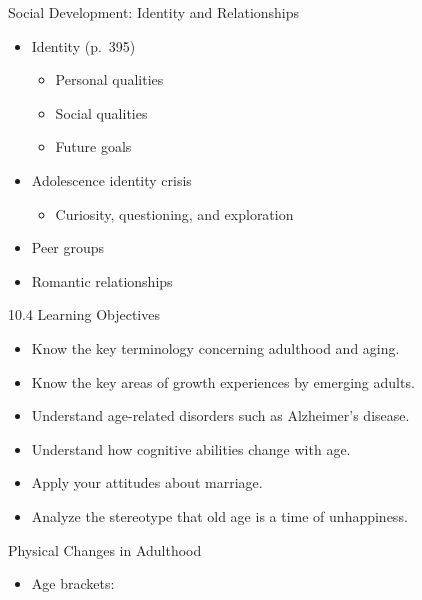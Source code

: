 \documentclass[
]{book}
\providecommand{\tightlist}{%
  \setlength{\itemsep}{0pt}\setlength{\parskip}{0pt}}
\begin{document}
\begin{reflect}
Social Development: Identity and Relationships

\begin{itemize}
\tightlist
\item
  Identity (p.~395)

  \begin{itemize}
  \tightlist
  \item
    Personal qualities\\
  \item
    Social qualities\\
  \item
    Future goals\\
  \end{itemize}
\item
  Adolescence identity crisis

  \begin{itemize}
  \tightlist
  \item
    Curiosity, questioning, and exploration\\
  \end{itemize}
\item
  Peer groups\\
\item
  Romantic relationships
\end{itemize}

10.4 Learning Objectives

\begin{itemize}
\tightlist
\item
  Know the key terminology concerning adulthood and aging.\\
\item
  Know the key areas of growth experiences by emerging adults.\\
\item
  Understand age-related disorders such as Alzheimer's disease.\\
\item
  Understand how cognitive abilities change with age.\\
\item
  Apply your attitudes about marriage.\\
\item
  Analyze the stereotype that old age is a time of unhappiness.
\end{itemize}

Physical Changes in Adulthood

\begin{itemize}
\tightlist
\item
  Age brackets:


\end{itemize}
\end{reflect}
\end{document}
